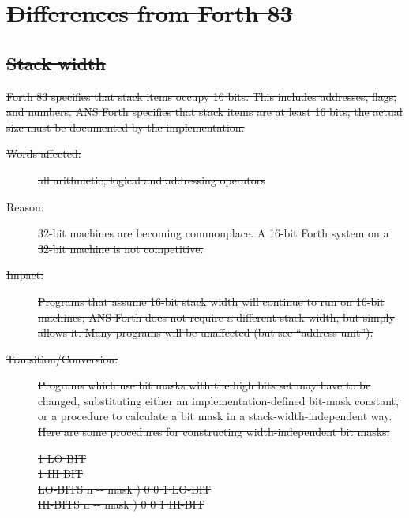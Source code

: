 \section[Differences from Forth 83]{\sout{Differences from Forth 83}} %

\subsection[Stack width]{\sout{Stack width}} %

\sout{%
Forth 83 specifies that stack items occupy 16 bits. This includes
addresses, flags, and numbers. ANS Forth specifies that stack items
are at least 16 bits; the actual size must be documented by the
implementation.}

\begin{description}
\item[\sout{Words affected:}]
	\sout{all arithmetic, logical and addressing operators}

\item[\sout{Reason:}]
	\sout{32-bit machines are becoming commonplace. A 16-bit Forth
	system on a 32-bit machine is not competitive.}

\item[\sout{Impact:}]
	\sout{Programs that assume 16-bit stack width will continue to run on
	16-bit machines; ANS Forth does not require a different stack
	width, but simply allows it. Many programs will be unaffected
	(but see ``address unit'').}

\item[\sout{Transition/Conversion:}]
	\sout{Programs which use bit masks with the high bits set may have to
	be changed, substituting either an implementation-defined bit-mask
	constant, or a procedure to calculate a bit mask in a
	stack-width-independent way. Here are some procedures for
	constructing width-in\-de\-pend\-ent bit masks:}

	\begin{tt}
		\sout{1  LO-BIT} \\
		\sout{ 1 
			\quad {}
			\quad {} HI-BIT} \\
		\sout{\word{:} LO-BITS  n -{}- mask )
			0 	0 
				1 		LO-BIT 
		\word{;}} \\
		\sout{\word{:} HI-BITS  n -{}- mask )
			0 	0 
				1 	HI-BIT 
		\word{;}}
	\end{tt}
\end{description}

